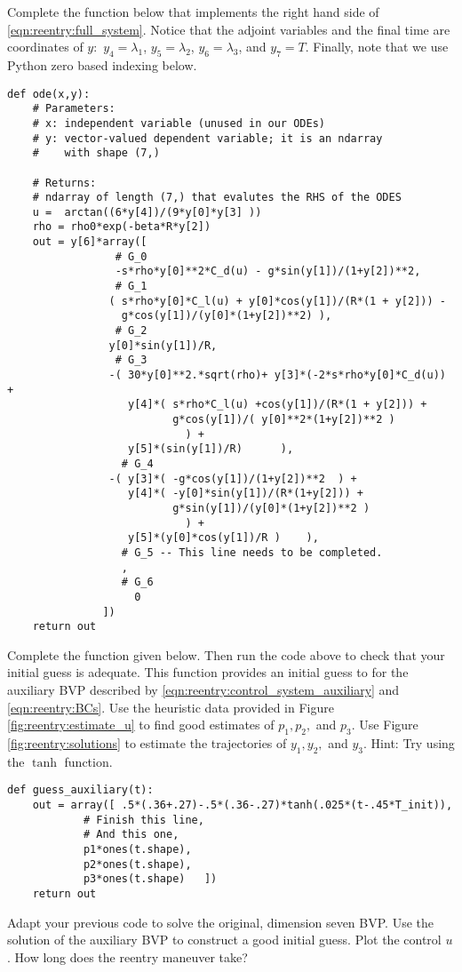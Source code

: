 
Complete the function  below that implements the right hand side of \eqref{eqn:reentry:full_system}. 
Notice that the adjoint variables and the final time are coordinates of $y:$ $y_4 = \lambda_1$, $y_5 = \lambda_2$, $y_6=\lambda_3$, and $y_7 = T$. Finally, note that we use Python zero based indexing below.
\begin{lstlisting}
def ode(x,y):
	# Parameters:
	# x: independent variable (unused in our ODEs)
	# y: vector-valued dependent variable; it is an ndarray 
	# 	 with shape (7,)
	
	# Returns: 
	# ndarray of length (7,) that evalutes the RHS of the ODES
	u =	 arctan((6*y[4])/(9*y[0]*y[3] ))
	rho = rho0*exp(-beta*R*y[2])
	out = y[6]*array([
				 # G_0
				 -s*rho*y[0]**2*C_d(u) - g*sin(y[1])/(1+y[2])**2,	
				 # G_1	 
				( s*rho*y[0]*C_l(u) + y[0]*cos(y[1])/(R*(1 + y[2])) - 
				  g*cos(y[1])/(y[0]*(1+y[2])**2) ),						 
				 # G_2
				y[0]*sin(y[1])/R,		
				 # G_3								 
				-( 30*y[0]**2.*sqrt(rho)+ y[3]*(-2*s*rho*y[0]*C_d(u)) + 
				   y[4]*( s*rho*C_l(u) +cos(y[1])/(R*(1 + y[2])) + 
						  g*cos(y[1])/( y[0]**2*(1+y[2])**2 ) 
							) + 
				   y[5]*(sin(y[1])/R)	   ),	
				  # G_4						 
				-( y[3]*( -g*cos(y[1])/(1+y[2])**2	) + 
				   y[4]*( -y[0]*sin(y[1])/(R*(1+y[2])) + 
						  g*sin(y[1])/(y[0]*(1+y[2])**2 ) 
							) + 
				   y[5]*(y[0]*cos(y[1])/R )	   ),
				  # G_5 -- This line needs to be completed.						 
				  ,			
				  # G_6	
					0 									 
			   ])
	return out
\end{lstlisting}

	Complete the function  given below. Then run the code above to check that your initial guess is adequate. 
	This function provides an initial guess to  for the auxiliary BVP described by  \eqref{eqn:reentry:control_system_auxiliary} and \eqref{eqn:reentry:BCs}.
	Use the heuristic data provided in Figure \ref{fig:reentry:estimate_u} to find good estimates of $p_1, p_2,$ and $p_3$. 
	Use Figure \ref{fig:reentry:solutions} to estimate the trajectories of $y_1, y_2,$ and $y_3$. Hint: Try using the $\tanh$ function.
	
\begin{lstlisting}
def guess_auxiliary(t):
	out = array([ .5*(.36+.27)-.5*(.36-.27)*tanh(.025*(t-.45*T_init)),
			# Finish this line, 
			# And this one, 
			p1*ones(t.shape),
			p2*ones(t.shape),
			p3*ones(t.shape)   ])
	return out
\end{lstlisting}	
	\label{prob:reentry:guess}

	Adapt your previous code to solve the original, dimension seven BVP. 
	Use the solution of the auxiliary BVP to construct a good initial guess.
	Plot the control $u$. How long does the reentry maneuver take? 
